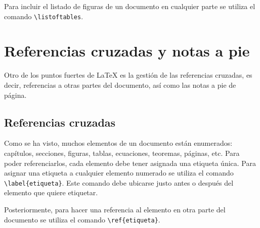 \documentclass[
  spanish,
  a4paper,
]{scrreport}
\theoremstyle{definition}
\theoremstyle{remark}
\begin{document}
Para incluir el listado de figuras de un documento en cualquier parte se
utiliza el comando \texttt{\textbackslash{}listoftables}.


\chapter{Referencias cruzadas y notas a
pie}\label{referencias-cruzadas-y-notas-a-pie}

Otro de los puntos fuertes de LaTeX es la gestión de las referencias
cruzadas, es decir, referencias a otras partes del documento, así como
las notas a pie de página.

\section{Referencias cruzadas}\label{referencias-cruzadas}

Como se ha visto, muchos elementos de un documento están enumerados:
capítulos, secciones, figuras, tablas, ecuaciones, teoremas, páginas,
etc. Para poder referenciarlos, cada elemento debe tener asignada una
etiqueta única. Para asignar una etiqueta a cualquier elemento numerado
se utiliza el comando \texttt{\textbackslash{}label\{etiqueta\}}. Este
comando debe ubicarse justo antes o después del elemento que quiere
etiquetar.

Posteriormente, para hacer una referencia al elemento en otra parte del
documento se utiliza el comando
\texttt{\textbackslash{}ref\{etiqueta\}}.
\end{document}

